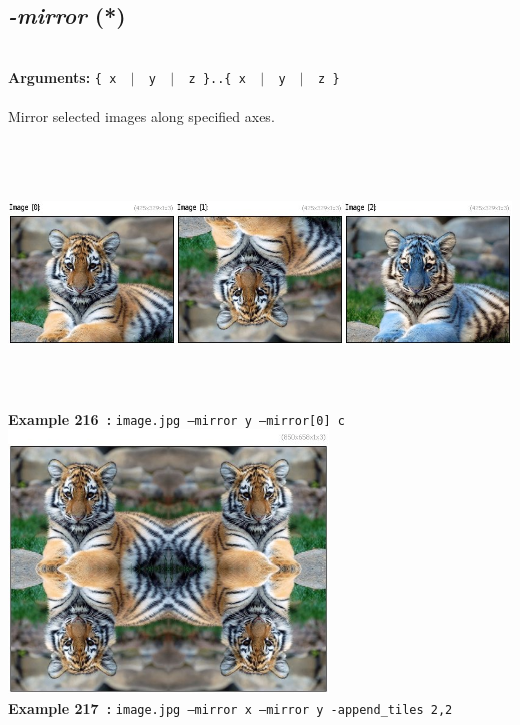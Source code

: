 \documentclass[a4paper,11pt,twoside]{book}
\begin{document}
\subsection{\emph{-mirror} (*)}\vspace*{-0.5em}
~\\\textbf{Arguments: } 
{\small \texttt{\{ x ~$|$~ y ~$|$~ z \}..\{ x ~$|$~ y ~$|$~ z \}}}\\~\\
Mirror selected images along specified axes.
\begin{center}\includegraphics[keepaspectratio=true,height=7cm,width=\textwidth]{img/gmic_def216.jpg}\\
{\footnotesize \textbf{Example 216~:} \texttt{image.jpg --mirror y --mirror[0] c}}
\\\includegraphics[keepaspectratio=true,height=7cm,width=\textwidth]{img/gmic_def217.jpg}\\
{\footnotesize \textbf{Example 217~:} \texttt{image.jpg --mirror x --mirror y -append\_tiles 2,2}}
\end{center}
\end{document}
